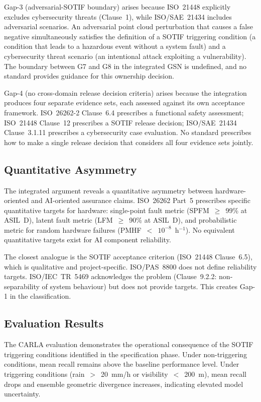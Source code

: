 Gap-3 (adversarial-SOTIF boundary) arises because ISO~21448 explicitly
excludes cybersecurity threats (Clause~1), while ISO/SAE~21434 includes
adversarial scenarios. An adversarial point cloud perturbation that causes
a false negative simultaneously satisfies the definition of a SOTIF
triggering condition (a condition that leads to a hazardous event
without a system fault) and a cybersecurity threat scenario (an
intentional attack exploiting a vulnerability). The boundary between
G7 and G8 in the integrated GSN is undefined, and no standard provides
guidance for this ownership decision.

Gap-4 (no cross-domain release decision criteria) arises because the
integration produces four separate evidence sets, each assessed against
its own acceptance framework. ISO~26262-2 Clause~6.4 prescribes a
functional safety assessment; ISO~21448 Clause~12 prescribes a SOTIF
release decision; ISO/SAE~21434 Clause~3.1.11 prescribes a cybersecurity
case evaluation. No standard prescribes how to make a single release
decision that considers all four evidence sets jointly.

\subsection{Quantitative Asymmetry}

The integrated argument reveals a quantitative asymmetry between
hardware-oriented and AI-oriented assurance claims. ISO~26262 Part~5
prescribes specific quantitative targets for hardware: single-point
fault metric (SPFM~$\geq$~99\% at ASIL~D), latent fault metric
(LFM~$\geq$~90\% at ASIL~D), and probabilistic metric for random
hardware failures (PMHF~$<$~$10^{-8}$~h$^{-1}$). No equivalent
quantitative targets exist for AI component reliability.

The closest analogue is the SOTIF acceptance criterion (ISO~21448
Clause~6.5), which is qualitative and project-specific. ISO/PAS~8800
does not define reliability targets. ISO/IEC~TR~5469 acknowledges the
problem (Clause~9.2.2: non-separability of system behaviour) but does
not provide targets. This creates Gap-1 in the classification.

\subsection{Evaluation Results}

The CARLA evaluation demonstrates the operational consequence of the
SOTIF triggering conditions identified in the specification phase.
Under non-triggering conditions, mean recall remains above the baseline
performance level. Under triggering conditions (rain~$>$~20~mm/h or
visibility~$<$~200~m), mean recall drops and ensemble geometric
divergence increases, indicating elevated model uncertainty.

